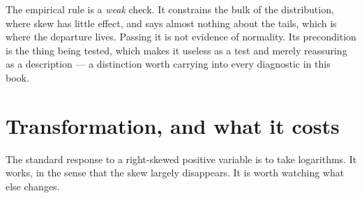 \documentclass[
  letterpaper,
  10pt,
  twoside,
  openright,
  numbers=noenddot,
  chapterprefix=true]{scrbook}
\begin{document}
The empirical rule is a \emph{weak} check. It constrains the bulk of the
distribution, where skew has little effect, and says almost nothing
about the tails, which is where the departure lives. Passing it is not
evidence of normality. Its precondition is the thing being tested, which
makes it useless as a test and merely reassuring as a description --- a
distinction worth carrying into every diagnostic in this book.

\section{Transformation, and what it
costs}\label{transformation-and-what-it-costs}

The standard response to a right-skewed positive variable is to take
logarithms. It works, in the sense that the skew largely disappears. It
is worth watching what else changes.
\end{document}
